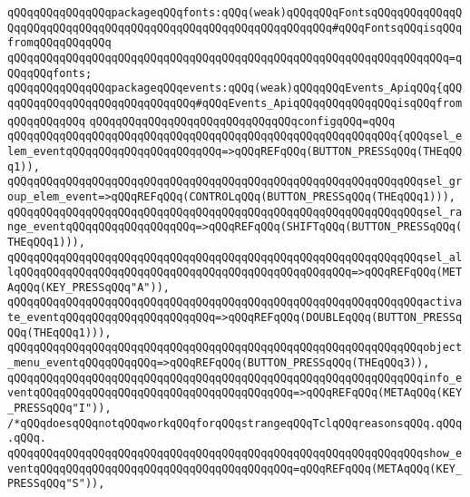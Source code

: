 \newline
\verb|qQQqqQQqqQQqqQQqpackageqQQqfonts:qQQq(weak)qQQqqQQqFontsqQQqqQQqqQQqqQQqqQQqqQQqqQQqqQQqqQQqqQQqqQQqqQQqqQQqqQQqqQQqqQQq#qQQqFontsqQQqisqQQqfromqQQqqQQqqQQq|\newline
\verb|qQQqqQQqqQQqqQQqqQQqqQQqqQQqqQQqqQQqqQQqqQQqqQQqqQQqqQQqqQQqqQQqqQQq=qQQqqQQqfonts;|\newline
\newline
\verb|qQQqqQQqqQQqqQQqpackageqQQqevents:qQQq(weak)qQQqqQQqEvents_ApiqQQq{qQQqqQQqqQQqqQQqqQQqqQQqqQQqqQQq#qQQqEvents_ApiqQQqqQQqqQQqqQQqisqQQqfromqQQqqQQqqQQq|\newline
\newline
\verb|qQQqqQQqqQQqqQQqqQQqqQQqqQQqqQQqconfigqQQq=qQQq|\newline
\verb|qQQqqQQqqQQqqQQqqQQqqQQqqQQqqQQqqQQqqQQqqQQqqQQqqQQqqQQqqQQq{qQQqsel_elem_eventqQQqqQQqqQQqqQQqqQQqqQQq=>qQQqREFqQQq(BUTTON_PRESSqQQq(THEqQQq1)),|\newline
\verb|qQQqqQQqqQQqqQQqqQQqqQQqqQQqqQQqqQQqqQQqqQQqqQQqqQQqqQQqqQQqqQQqsel_group_elem_event=>qQQqREFqQQq(CONTROLqQQq(BUTTON_PRESSqQQq(THEqQQq1))),|\newline
\verb|qQQqqQQqqQQqqQQqqQQqqQQqqQQqqQQqqQQqqQQqqQQqqQQqqQQqqQQqqQQqqQQqsel_range_eventqQQqqQQqqQQqqQQqqQQq=>qQQqREFqQQq(SHIFTqQQq(BUTTON_PRESSqQQq(THEqQQq1))),|\newline
\verb|qQQqqQQqqQQqqQQqqQQqqQQqqQQqqQQqqQQqqQQqqQQqqQQqqQQqqQQqqQQqqQQqsel_allqQQqqQQqqQQqqQQqqQQqqQQqqQQqqQQqqQQqqQQqqQQqqQQqqQQq=>qQQqREFqQQq(METAqQQq(KEY_PRESSqQQq"A")),|\newline
\verb|qQQqqQQqqQQqqQQqqQQqqQQqqQQqqQQqqQQqqQQqqQQqqQQqqQQqqQQqqQQqqQQqactivate_eventqQQqqQQqqQQqqQQqqQQqqQQq=>qQQqREFqQQq(DOUBLEqQQq(BUTTON_PRESSqQQq(THEqQQq1))),|\newline
\verb|qQQqqQQqqQQqqQQqqQQqqQQqqQQqqQQqqQQqqQQqqQQqqQQqqQQqqQQqqQQqqQQqobject_menu_eventqQQqqQQqqQQq=>qQQqREFqQQq(BUTTON_PRESSqQQq(THEqQQq3)),|\newline
\verb|qQQqqQQqqQQqqQQqqQQqqQQqqQQqqQQqqQQqqQQqqQQqqQQqqQQqqQQqqQQqqQQqinfo_eventqQQqqQQqqQQqqQQqqQQqqQQqqQQqqQQqqQQqqQQq=>qQQqREFqQQq(METAqQQq(KEY_PRESSqQQq"I")),|\newline
\verb|/*qQQqdoesqQQqnotqQQqworkqQQqforqQQqstrangeqQQqTclqQQqreasonsqQQq.qQQq.qQQq.|\newline
\verb|qQQqqQQqqQQqqQQqqQQqqQQqqQQqqQQqqQQqqQQqqQQqqQQqqQQqqQQqqQQqqQQqshow_eventqQQqqQQqqQQqqQQqqQQqqQQqqQQqqQQqqQQqqQQq=qQQqREFqQQq(METAqQQq(KEY_PRESSqQQq"S")),|\newline
